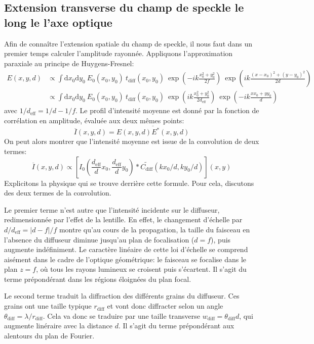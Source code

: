 \subsection{Extension transverse du champ de speckle le long le l'axe optique}
Afin de connaître l'extension spatiale du champ de speckle, il nous faut dans un premier temps calculer l'amplitude rayonnée. Appliquons l'approximation paraxiale au principe de Huygens-Fresnel:
\begin{align}
E(x,y,d)&\propto \int{\mathrm{d}x_0 \mathrm{d}y_0 \: E_0(x_0,y_0) \: t_{\mathrm{diff}}(x_0,y_0) \: \exp{\left( -ik\frac{x_0^2+y_0^2}{2f} \right) } \: \exp{ \left( ik\frac{(x-x_0)^2+(y-y_0)^2}{2d} \right) }} \\
&\propto \int{\mathrm{d}x_0 \mathrm{d}y_0 \: E_0(x_0,y_0) \: t_{\mathrm{diff}}(x_0,y_0) \: \exp{\left( ik\frac{x_0^2+y_0^2}{2d_{\mathrm{eff}}} \right) } \: \exp{\left( -ik \frac{xx_0+yy_0}{d} \right) }}
\end{align}
avec $1/d_{\mathrm{eff}}=1/d-1/f$. Le profil d'intensité moyenne est donné par la fonction de corrélation en amplitude, évaluée aux deux mêmes points:
\begin{equation}
\overline{I}(x,y,d)=\overline{E(x,y,d)E^*(x,y,d)}
\end{equation}
On peut alors montrer que l'intensité moyenne est issue de la convolution de deux termes:
\begin{equation}
\overline{I}(x,y,d)\propto \left[ I_0(\frac{d_{\mathrm{eff}}}{d}x_0,\frac{d_{\mathrm{eff}}}{d}y_0) \ast \widetilde{C_{\mathrm{diff}}}(kx_0/d,ky_0/d) \right] (x,y)
\end{equation}
Explicitons la physique qui se trouve derrière cette formule. Pour cela, discutons des deux termes de la convolution. 

Le premier terme n'est autre que l'intensité incidente sur le diffuseur, redimensionnée par l'effet de la lentille. En effet, le changement d'échelle par $d/d_{\mathrm{eff}}=\left| d-f \right| /f$ montre qu'au cours de la propagation, la taille du faisceau en l'absence du diffuseur diminue jusqu'au plan de focalisation ($d=f$), puis augmente indéfiniment. Le caractère linéaire de cette loi d'échelle se comprend aisément dans le cadre de l'optique géométrique: le faisceau se focalise dans le plan $z=f$, où tous les rayons lumineux se croisent puis s'écartent. Il s'agit du terme prépondérant dans les régions éloignées du plan focal.

Le second terme traduit la diffraction des différents grains du diffuseur. Ces grains ont une taille typique $r_{\mathrm{diff}}$ et vont donc diffracter selon un angle $\theta_{\mathrm{diff}}=\lambda/r_{\mathrm{diff}}$. Cela va donc se traduire par une taille transverse $w_{\mathrm{diff}}=\theta_{\mathrm{diff}} d$, qui augmente linéraire avec la distance $d$. Il s'agit du terme prépondérant aux alentours du plan de Fourier. 

